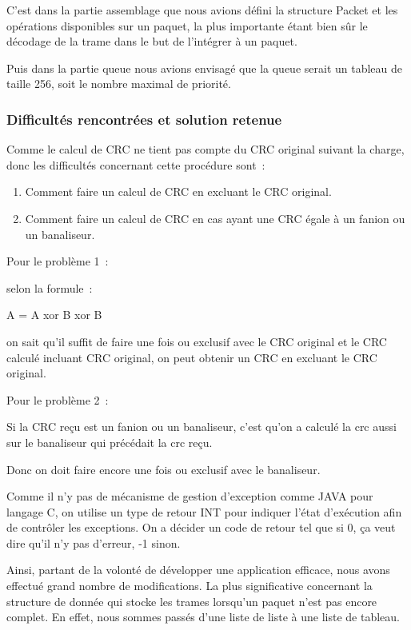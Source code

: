 \documentclass[a4paper,11pt]{article}
\begin{document}
C'est dans la partie assemblage que nous avions défini la structure Packet et les opérations disponibles sur un paquet, la plus importante étant bien sûr le décodage de la trame dans le but de l'intégrer à un paquet.

Puis dans la partie queue nous avions envisagé que la queue serait un tableau de taille 256, soit le nombre maximal de priorité. 


\subsubsection{Difficultés rencontrées et solution retenue}

Comme le calcul de CRC ne tient pas compte du CRC original suivant la charge, donc les difficultés concernant cette procédure sont :
\begin{enumerate}
 \item Comment faire un calcul de CRC en excluant le CRC original.
 \item Comment faire un calcul de CRC en cas ayant une CRC égale à un fanion ou un banaliseur.
\end{enumerate}


\vspace{0.5cm}

Pour le problème 1 :

selon la formule :

A = A xor B xor B

on sait qu'il suffit de faire une fois ou exclusif avec le CRC original et le CRC calculé incluant CRC original, on peut obtenir un CRC  en excluant le CRC original.

Pour le problème 2 :

Si la CRC reçu est un fanion ou un banaliseur, c'est qu'on a
 calculé la crc aussi sur le banaliseur qui précédait la crc reçu.

Donc on doit faire encore une fois ou exclusif avec le banaliseur.


Comme il n'y pas de mécanisme de gestion d'exception comme JAVA pour langage C, on utilise un type de retour INT pour indiquer l'état d'exécution afin de contrôler les exceptions.
On a décider un code de retour tel que si 0, ça veut dire qu'il n'y pas d'erreur, -1 sinon.

\vspace{0.5cm}

Ainsi, partant de la volonté de développer une application efficace, nous avons effectué grand nombre de modifications. La plus significative concernant la structure de donnée qui stocke les trames lorsqu'un paquet n'est pas encore complet. En effet, nous sommes passés d'une liste de liste à une liste de tableau.
\end{document}
